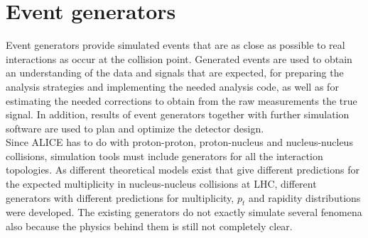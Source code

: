 \section{Event generators}
Event generators provide simulated events that are as close as possible to real interactions as occur at the collision point. Generated events are used to obtain an understanding of the data and signals that are expected, for preparing the analysis strategies and implementing the needed analysis code, as well as for estimating the needed corrections to obtain from the raw measurements the true signal. In addition, results of event generators together with further simulation software are used to plan and optimize the detector design. \\Since ALICE has to do with proton-proton, proton-nucleus and nucleus-nucleus collisions, simulation tools must include generators for all the interaction topologies.
As different theoretical models exist that give different predictions for the expected multiplicity in nucleus-nucleus collisions at LHC, different generators with different predictions for multiplicity, $p_t$ and rapidity distributions were developed.
The existing generators do not exactly simulate several fenomena also because the physics behind them is still not completely clear.\\
